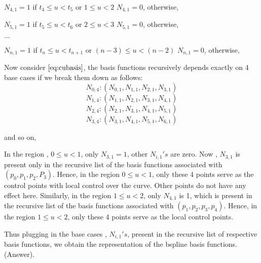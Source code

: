 \documentclass{article}
\begin{document}
$N_{4,1} = 1$ if $t_4 \leq u < t_5$ or $1 \leq u < 2$ \newline
$N_{4,1} = 0$, otherwise, \newline \newline

$N_{5,1} = 1$ if $t_5 \leq u < t_6$ or $2 \leq u < 3$ \newline
$N_{5,1} = 0$, otherwise, \newline 

$\dots$ \newline

$N_{n,1} = 1$ if $t_n \leq u < t_{n+1}$ or $(n-3) \leq u < (n-2)$ \newline
$N_{n,1} = 0$, otherwise, \newline \newline

Now consider $\eqref{eq:cubasis}$, the basis functions recursively depends exactly on 4 base cases if we break them down as follows: \newline
\[ N_{0,4} : (N_{0,1}, N_{1,1}, N_{2,1}, N_{3,1})\]
\[ N_{1,4} : ( N_{1,1}, N_{2,1}, N_{3,1}, N_{4,1})\]
\[ N_{2,4} : ( N_{2,1}, N_{3,1}, N_{4,1}, N_{5,1})\]
\[ N_{3,4} : ( N_{3,1}, N_{4,1}, N_{5,1}, N_{6,1})\]

and so on, \newline

In the region , $0 \leq u < 1$, only $N_{3,1}=1$, other $N_{i,1}'s$ are zero. Now , $N_{3,1}$ is present only in the recursive list of the basis functions associated with  $(p_0, p_1, p_2, P_3)$. Hence, in the region $0 \leq u < 1$, only these 4 points serve as the control points with local control over the curve. Other points do not have any effect here. Similarly, in the region $1 \leq u < 2$, only $N_{4,1}$ is 1, which is present in the recursive list of the basis functions associated with $(p_1, p_2, p_3,p_4)$. Hence, in the region $1 \leq u < 2$, only these 4 points serve as the local control points. \newline

Thus plugging in the base cases , $N_{i,1}'s$, present in the recursive list of respective basis functions, we obtain the representation of the bspline basis functions. (Answer). \newline
\end{document}
